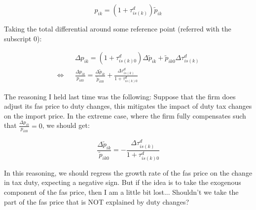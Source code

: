 \documentclass[11pt,twoside, authoryear]{elsarticle}
\begin{document}
$$p_{ik} = (1+\tau^d_{is(k)})\widetilde{p}_{ik}$$

Taking the total differential around some reference point (referred with the subscript $0$):

\begin{eqnarray*}
&&\Delta p_{ik} = (1+\tau^d_{is(k)0})\Delta \widetilde{p}_{ik} + \widetilde{p}_{ik0}\Delta \tau^d_{is(k)}\\
\Leftrightarrow && \frac{\Delta p_{ik}}{p_{ik0}} = \frac{\Delta \widetilde{p}_{ik}}{\widetilde{p}_{ik0}} + \frac{\Delta \tau^d_{is(k)}}{1+\tau^d_{is(k)0}}
\end{eqnarray*}

The reasoning I held last time was the following: Suppose that the firm does adjust its fas price to duty changes, this mitigates the impact of duty tax changes on the import price. In the extreme case, where the firm fully compensates such that $\frac{\Delta p_{ik}}{p_{ik0}} = 0$, we should get:

$$\frac{\Delta \widetilde{p}_{ik}}{\widetilde{p}_{ik0}} = - \frac{\Delta \tau^d_{is(k)}}{1+\tau^d_{is(k)0}}$$

In this reasoning, we should regress the growth rate of the fas price on the change in tax duty, expecting a negative sign. But if the idea is to take the exogenous component of the fas price, then I am a little bit lost... Shouldn't we take the part of the fas price that is NOT explained by duty changes? 
\end{document}
